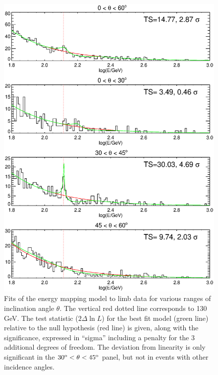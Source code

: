 \documentclass[aps,twocolumn,prd,superscriptaddress,showpacs,nofootinbib,fixfloat]{revtex4}
\newcommand{\degree}{^{\rm o}}
\begin{document}
\begin{figure}
  \centering
  \includegraphics[width=1.0\linewidth]{plots/limbfits.ps}
  \caption{Fits of the energy mapping model to limb data for
  various ranges of inclination angle $\theta$.  The
  vertical red dotted line corresponds to 130 GeV.  The test
  statistic ($2\Delta\ln L$) for the best fit model (green
  line) relative to the null hypothesis (red line) is given,
  along with the significance, expressed in ``sigma''
  including a penalty for the 3 additional degrees of
  freedom.  The deviation from linearity is only significant
  in the $30\degree < \theta < 45\degree$ panel, but {\emph not} in events with other incidence angles.}
  \label{fig:limbfits}
\end{figure}

\end{document}
